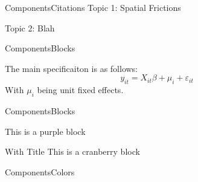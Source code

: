 \documentclass[aspectratio=169]{beamer}
\begin{document}
\begin{frame}{Components}{Citations}
    Topic 1: Spatial Frictions
    \begin{citecolor}
    \end{citecolor}

    \vspace{5mm}
    Topic 2: Blah 
    \begin{citecolor}
    \end{citecolor}
\end{frame}

\begin{frame}{Components}{Blocks}
  \begin{block}{}
    The main specificaiton is as follows: 
    $$
      y_{it} = X_{it} \beta + \mu_i + \varepsilon_{it}
    $$
    With $\mu_i$ being unit fixed effects.
  \end{block}
\end{frame}

\begin{frame}{Components}{Blocks}
  \begin{purpleBlock}{}
      This is a purple block
  \end{purpleBlock}

  \begin{cranberryBlock}{With Title}
    This is a cranberry block
  \end{cranberryBlock}
\end{frame}

\begin{frame}{Components}{Colors}








\end{frame}
\end{document}
